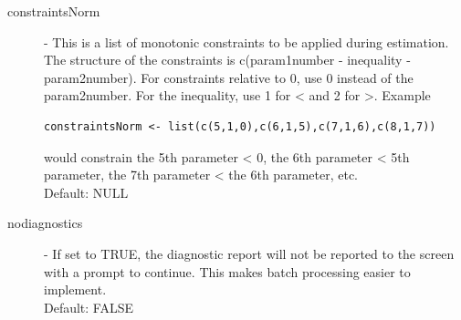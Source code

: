 \documentclass{article}\usepackage{graphicx, color}
\begin{document}
\begin{description}
\item[constraintsNorm] - This is a list of monotonic constraints to be applied during estimation. The structure of the constraints is c(param1number - inequality - param2number). For constraints relative to 0, use 0 instead of the param2number. For the inequality, use 1 for < and 2 for >. Example \begin{verbatim}constraintsNorm <- list(c(5,1,0),c(6,1,5),c(7,1,6),c(8,1,7))\end{verbatim} would constrain the 5th parameter < 0, the 6th parameter < 5th parameter, the 7th parameter < the 6th parameter, etc. \\ Default: NULL

\item[nodiagnostics] - If set to TRUE, the diagnostic report will not be reported to the screen with a prompt to continue. This makes batch processing easier to implement.\\ 
Default: FALSE

\end{description}     
\end{document}
